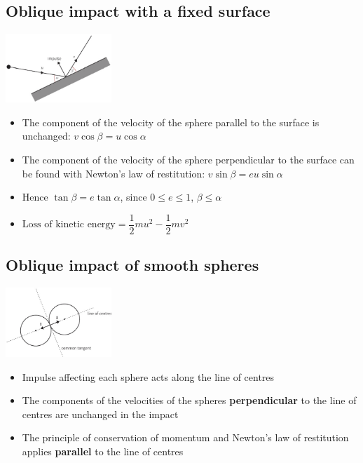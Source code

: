 \documentclass[11pt, A4paper]{article}
\begin{document}
	\subsection{Oblique impact with a fixed surface}
	\includegraphics[width=0.3\textwidth]{obliqueimpact}
	\begin{itemize}
		\item The component of the velocity of the sphere parallel to the surface is unchanged: $v\cos\beta = u\cos\alpha$
		\item The component of the velocity of the sphere perpendicular to the surface can be found with Newton's law of restitution: $v\sin\beta = eu\sin\alpha$
		\item Hence $\tan\beta = e\tan\alpha$, since $0 \leq e \leq 1$, $\beta \leq \alpha$
		\item $\text{Loss of kinetic energy}=\dfrac{1}{2}mu^2-\dfrac{1}{2}mv^2$
	\end{itemize}
	\subsection{Oblique impact of smooth spheres}
	\includegraphics[width=0.3\textwidth]{oblique_2_balls}
	\begin{itemize}
		\item Impulse affecting each sphere acts along the line of centres
		\item The components of the velocities of the spheres \textbf{perpendicular}  to the line of centres are unchanged in the impact
		\item The principle of conservation of momentum and Newton's law of restitution applies \textbf{parallel} to the line of centres
	\end{itemize}
	
	
	
	
	
\end{document}
